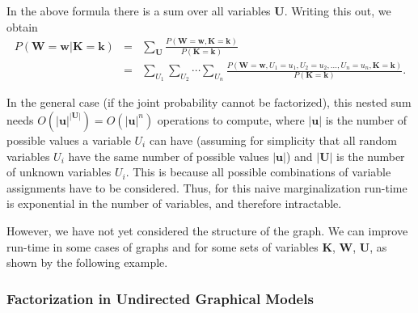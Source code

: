 In the above formula there is a sum over all variables \textbf{$\mathbf{U}$}.
Writing this out, we obtain 
\begin{eqnarray}
P(\mathbf{W}=\mathbf{w}|\mathbf{K}=\mathbf{k}) & = & \sum_{\mathbf{U}}\frac{P(\mathbf{W}=\mathbf{w},\mathbf{K}=\mathbf{k})}{P(\mathbf{K}=\mathbf{k})}\label{eq:Inference in graphical models, written out}\\
 & = & \sum_{U_{1}}\sum_{U_{2}}\cdots\sum_{U_{n}}\frac{P(\mathbf{W}=\mathbf{w},U_{1}=u_{1},U_{2}=u_{2},\dots,U_{n}=u_{n},\mathbf{K}=\mathbf{k})}{P(\mathbf{K}=\mathbf{k})}.\nonumber 
\end{eqnarray}

In the general case (if the joint probability cannot be factorized),
this nested sum needs $O(|\mathbf{u}|^{|\mathbf{U}|})=O(|\mathbf{u}|^{n})$
operations to compute, where $|\mathbf{u}|$ is the number of possible
values a variable $U_{i}$ can have (assuming for simplicity that
all random variables $U_{i}$ have the same number of possible values
$|\mathbf{u}|$) and $|\mathbf{U}|$ is the number of unknown variables
$U_{i}$. This is because all possible combinations of variable assignments
have to be considered. Thus, for this naive marginalization run-time
is exponential in the number of variables, and therefore intractable.

However, we have not yet considered the structure of the graph. We
can improve run-time in some cases of graphs and for some sets of
variables $\mathbf{K}$, $\mathbf{W}$, $\mathbf{U}$, as shown by
the following example.

\subsubsection{Factorization in Undirected Graphical Models}

